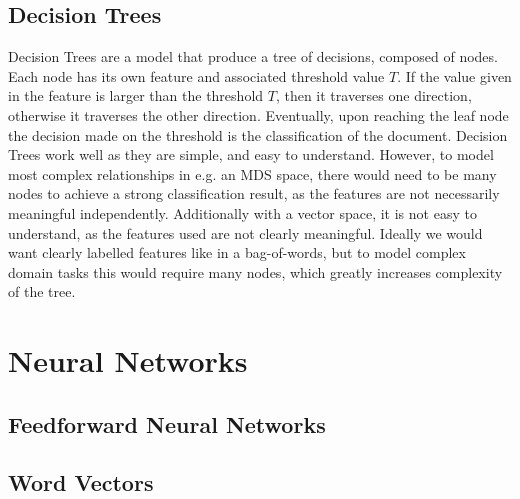 \subsection{Decision Trees}\label{bg:trees}

Decision Trees are a model that produce a tree of decisions, composed of nodes. Each node has its own feature and associated threshold value $T$.  If the value given in the feature is larger than the threshold $T$, then it traverses one direction, otherwise it traverses the other direction. Eventually, upon reaching the leaf node the decision made on the threshold is the classification of the document. Decision Trees work well as they are simple, and easy to understand. However, to model most complex relationships in e.g. an MDS space, there would need to be many nodes to achieve a strong classification result, as the features are not necessarily meaningful independently. Additionally with a vector space, it is not easy to understand, as the features used are not clearly meaningful. Ideally we would want clearly labelled features like in a bag-of-words, but to model complex domain tasks this would require many nodes, which greatly increases complexity of the tree. 








\section{Neural Networks}



\subsection{Feedforward Neural Networks}

\subsection{Word Vectors}\label{bg:WordVectors}

